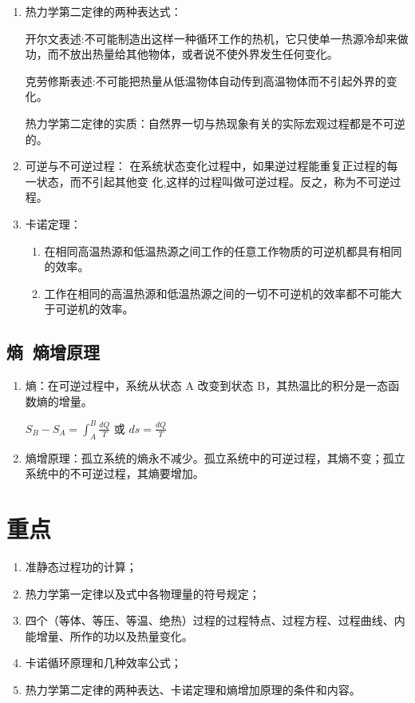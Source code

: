 \documentclass{ctexbook}
\begin{document}
\begin{enumerate}
    \item 热力学第二定律的两种表达式：
    
    开尔文表述:不可能制造出这样一种循环工作的热机，它只使单一热源冷却来做   功，而不放出热量给其他物体，或者说不使外界发生任何变化。    
    
    克劳修斯表述:不可能把热量从低温物体自动传到高温物体而不引起外界的变化。
    
    热力学第二定律的实质：自然界一切与热现象有关的实际宏观过程都是不可逆的。

    \item 可逆与不可逆过程：
    在系统状态变化过程中，如果逆过程能重复正过程的每一状态，而不引起其他变  化,这样的过程叫做可逆过程。反之，称为不可逆过程。

    \item 卡诺定理：
    
    \begin{enumerate}
        \item 在相同高温热源和低温热源之间工作的任意工作物质的可逆机都具有相同的效率。
        
        \item 工作在相同的高温热源和低温热源之间的一切不可逆机的效率都不可能大于可逆机的效率。
    \end{enumerate}
\end{enumerate}

\subsection{熵\ 熵增原理}

\begin{enumerate}
    \item 熵：在可逆过程中，系统从状态 A 改变到状态 B，其热温比的积分是一态函数熵的增量。
    
    $ S_B - S_A = \int_A^B{\frac{dQ}{T}}$ 或 $ ds = \frac{dQ}{T} $
    
    \item 熵增原理：孤立系统的熵永不减少。孤立系统中的可逆过程，其熵不变；孤立系统中的不可逆过程，其熵要增加。

\end{enumerate}

\section{重点}

\begin{enumerate}
    \item 准静态过程功的计算；
    \item 热力学第一定律以及式中各物理量的符号规定；
    \item 四个（等体、等压、等温、绝热）过程的过程特点、过程方程、过程曲线、内能增量、所作的功以及热量变化。
    \item 卡诺循环原理和几种效率公式；
    \item 热力学第二定律的两种表达、卡诺定理和熵增加原理的条件和内容。
\end{enumerate}
\end{document}
